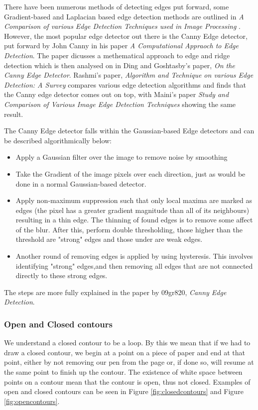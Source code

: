 \documentclass[11pt]{report}
\begin{document}
There have been numerous methods of detecting edges put forward,
some Gradient-based and Laplacian based edge detection methods are 
outlined in 
\textit{A Comparison of various Edge Detection Techniques used in Image Processing}
\cite{Shriv12}. However, the most popular edge detector out there is the
Canny Edge detector, put forward by John Canny in his paper
\textit{A Computational Appraoch to Edge Detection}\cite{Canny86}. The paper
dicusses a methematical approach to edge and ridge detection which is then
analysed on in Ding and Goshtasby's paper, 
\textit{On the Canny Edge Detector}\cite{Ding00}. Rashmi's paper,
\textit{Algorithm and Technique on various Edge Detection: A Survey}
\cite{Rashmi13} compares various edge detection algorithms and finds that 
the Canny edge detector comes out on top, with Maini's paper 
\textit{Study and Comparison of Various Image Edge Detection Techniques} 
\cite{Maini} showing the same result.

The Canny Edge detector falls within the Gaussian-based Edge detectors and
can be described algorithmically below:
\begin{itemize}
	\item Apply a Gaussian filter over the image to remove noise by smoothing
	\item Take the Gradient of the image pixels over each direction, just as
		  would be done in a normal Gaussian-based detector.
	\item Apply non-maximum suppression 
		  such that only local maxima are marked as edges (the pixel 
		  has a greater gradient magnitude than all
		  of its neighbours) resulting in a thin edge. The thinning of found
		  edges is to remove some affect of the blur. After this, perform
		  double thresholding, those higher than the threshold are "strong" edges
		  and those under are weak edges.
	\item Another round of removing edges is applied by using hysteresis.
		  This involves identifying "strong" edges,and then removing 
		  all edges that are not connected directly to these strong edges.
\end{itemize}

The steps are more fully explained in the paper by 09gr820, 
\textit{Canny Edge Detection}\cite{09gr820}.

\subsubsection*{Open and Closed contours}
We understand a closed contour to be a loop. By this we mean that if we had
to draw a closed contour, we begin at a point on a piece of paper and end at that
point, either by not removing our pen from the page or, if done so, will resume
at the same point to finish up the contour. The existence of white space between
points on a contour mean that the contour is open, thus not closed. Examples
of open and closed contours can be seen in Figure \ref{fig:closedcontours} and 
Figure \ref{fig:opencontours}.
\\
\end{document}
